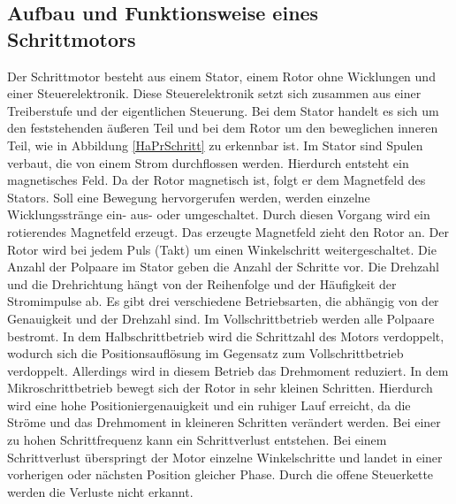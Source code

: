 \subsection{Aufbau und Funktionsweise eines Schrittmotors}
Der Schrittmotor besteht aus einem Stator, einem Rotor ohne Wicklungen und einer Steuerelektronik. Diese Steuerelektronik setzt sich zusammen aus einer Treiberstufe und der eigentlichen Steuerung. Bei dem Stator handelt es sich um den feststehenden äußeren Teil und bei dem Rotor um den beweglichen inneren Teil, wie in Abbildung \ref{HaPrSchritt} zu erkennbar ist. Im Stator sind Spulen verbaut, die von einem Strom durchflossen werden. Hierdurch entsteht ein magnetisches Feld. Da der Rotor magnetisch ist, folgt er dem Magnetfeld des Stators. Soll eine Bewegung hervorgerufen werden, werden einzelne Wicklungsstränge ein- aus- oder umgeschaltet. Durch diesen Vorgang wird ein rotierendes Magnetfeld erzeugt. Das erzeugte Magnetfeld zieht den Rotor an. Der Rotor wird bei jedem Puls (Takt) um einen Winkelschritt weitergeschaltet. Die Anzahl der Polpaare im Stator geben die Anzahl der Schritte vor. Die Drehzahl und die Drehrichtung hängt von der Reihenfolge und der Häufigkeit der Stromimpulse ab. Es gibt drei verschiedene Betriebsarten, die abhängig von der Genauigkeit und der Drehzahl sind. Im Vollschrittbetrieb werden alle Polpaare bestromt. In dem Halbschrittbetrieb wird die Schrittzahl des Motors verdoppelt, wodurch sich die Positionsauflösung im Gegensatz zum Vollschrittbetrieb verdoppelt. Allerdings wird in diesem Betrieb das Drehmoment reduziert. In dem Mikroschrittbetrieb bewegt sich der Rotor in sehr kleinen Schritten. Hierdurch wird eine hohe Positioniergenauigkeit und ein ruhiger Lauf erreicht, da die Ströme und das Drehmoment in kleineren Schritten verändert werden. Bei einer zu hohen Schrittfrequenz kann ein Schrittverlust entstehen. Bei einem Schrittverlust überspringt der Motor einzelne Winkelschritte und landet in einer vorherigen oder nächsten Position gleicher Phase. Durch die offene Steuerkette werden die Verluste nicht erkannt.    \cite{Hagl.2021}\cite{Bernstein.2018}\cite{Schroder.2021}
